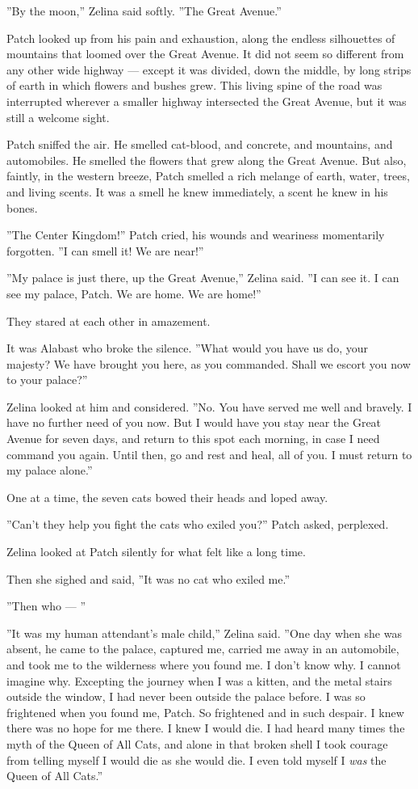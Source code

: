 \documentclass[12pt]{book}
\begin{document}
''By the moon,'' Zelina said softly. ''The Great Avenue.''

Patch looked up from his pain and exhaustion, along the endless silhouettes of mountains that loomed over the Great Avenue. It did not seem so different from any other wide highway ---
except it was divided, down the middle, by long strips of earth in which flowers and bushes grew. This living spine of the road was interrupted wherever a smaller highway intersected the Great Avenue, but it was still a welcome sight.

Patch sniffed the air. He smelled cat-blood, and concrete, and mountains, and automobiles. He smelled the flowers that grew along the Great Avenue. But also, faintly, in the western breeze, Patch smelled a rich melange of earth, water, trees, and living scents. It was a smell he knew immediately, a scent he knew in his bones.

''The Center Kingdom!'' Patch cried, his wounds and weariness momentarily forgotten. ''I can smell it! We are near!''

''My palace is just there, up the Great Avenue,'' Zelina said. ''I can see it. I can see my palace, Patch. We are home. We are home!''

They stared at each other in amazement.

It was Alabast who broke the silence. ''What would you have us do, your majesty? We have brought you here, as you commanded. Shall we escort you now to your palace?''

Zelina looked at him and considered. ''No. You have served me well and bravely. I have no further need of you now. But I would have you stay near the Great Avenue for seven days, and return to this spot each morning, in case I need command you again. Until then, go and rest and heal, all of you. I must return to my palace alone.''

One at a time, the seven cats bowed their heads and loped away.

''Can't they help you fight the cats who exiled you?'' Patch asked, perplexed.

Zelina looked at Patch silently for what felt like a long time.

Then she sighed and said, ''It was no cat who exiled me.''

''Then who ---
''

''It was my human attendant's male child,'' Zelina said. ''One day when she was absent, he came to the palace, captured me, carried me away in an automobile, and took me to the wilderness where you found me. I don't know why. I cannot imagine why. Excepting the journey when I was a kitten, and the metal stairs outside the window, I had never been outside the palace before. I was so frightened when you found me, Patch. So frightened and in such despair. I knew there was no hope for me there. I knew I would die. I had heard many times the myth of the Queen of All Cats, and alone in that broken shell I took courage from telling myself I would die as she would die. I even told myself I {\it was} the Queen of All Cats.''
\end{document}
